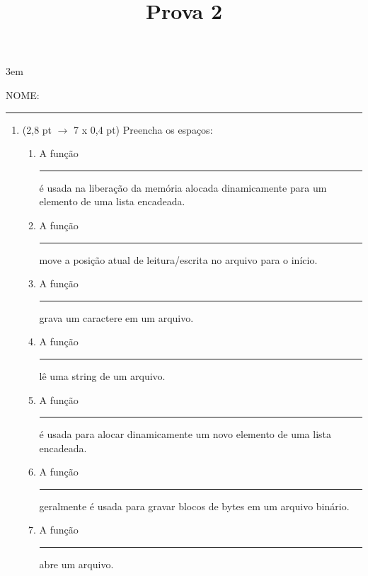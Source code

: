 \documentclass[a4paper,10pt]{article}
\title{Prova 2}
\begin{document}
\maketitle

\emergencystretch 3em



NOME: \rule{.85\textwidth}{0.1mm}

\begin{multicols*}{2}
\setlength{\leftmargini}{0pt}
\begin{enumerate}
  \item (2,8 pt $\rightarrow$ 7 x 0,4 pt) Preencha os espaços:

  \begin{enumerate}
    \item A função \rule{1cm}{0.2mm} é usada na liberação da memória alocada dinamicamente para um elemento de uma lista encadeada. %
    \item A função \rule{1cm}{0.2mm} move a posição atual de leitura/escrita no arquivo para o início. %
    \item A função \rule{1cm}{0.2mm} grava um caractere em um arquivo. %
    \item A função \rule{1cm}{0.2mm} lê uma string de um arquivo. %
    \item A função \rule{1cm}{0.2mm} é usada para alocar dinamicamente um novo elemento de uma lista encadeada. %
    \item A função \rule{1cm}{0.2mm} geralmente é usada para gravar blocos de bytes em um arquivo binário. %
    \item A função \rule{1cm}{0.2mm} abre um arquivo. %
  \end{enumerate}


\end{enumerate}
\end{multicols*}
\end{document}
